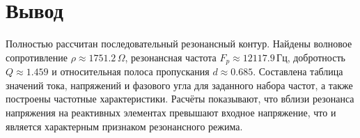\documentclass[12pt,a4paper]{article}
\begin{document}
\section*{Вывод}
Полностью рассчитан последовательный резонансный контур. Найдены волновое сопротивление 
$\rho\approx 1751.2\,\Omega$, резонансная частота $F_p\approx 12117.9\,\text{Гц}$, 
добротность $Q\approx 1.459$ и относительная полоса пропускания $d\approx 0.685$. 
Составлена таблица значений тока, напряжений и фазового угла для заданного набора 
частот, а также построены частотные характеристики. Расчёты показывают, что вблизи 
резонанса напряжения на реактивных элементах превышают входное напряжение, что и 
является характерным признаком резонансного режима.
\end{document}
